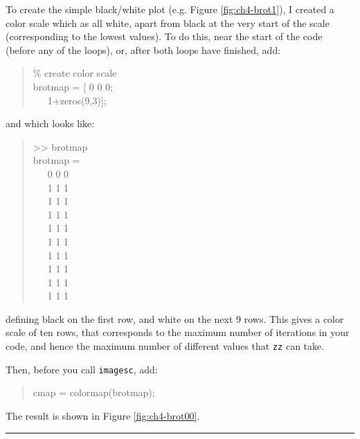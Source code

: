 \documentclass{tufte-book} %
\newenvironment{docspec}{\begin{quotation}\ttfamily\parskip0pt\parindent0pt\ignorespaces}{\end{quotation}}
\begin{document}
To create the simple black/white plot (e.g. Figure \ref{fig:ch4-brot1}), I created a color scale which as all white, apart from black at the very start of the scale (corresponding to the lowest values). To do this, near the start of the code (before any of the loops), or, after both loops have finished, add:
\begin{docspec}
\textcolor[rgb]{0,0.501961,0}{\% create color scale}\\
brotmap = [ 0 0 0;\\
\ \ \ 1+zeros(9,3)];
\end{docspec}
and which looks like:
\begin{docspec}
>> brotmap\\
brotmap =\\
\ \ \      0     0     0\\
\ \ \      1     1     1\\
\ \ \      1     1     1\\
\ \ \      1     1     1\\
\ \ \      1     1     1\\
\ \ \      1     1     1\\
\ \ \      1     1     1\\
\ \ \      1     1     1\\
\ \ \      1     1     1\\
\ \ \      1     1     1
\end{docspec}
defining black on the first row, and white on the next 9 rows. This gives a color scale of ten rows, that corresponds to the maximum number of iterations in your code, and hence the maximum number of different values that \texttt{zz} can take. 

Then, before you call \texttt{imagesc}, add:
\begin{docspec}
cmap = colormap(brotmap);
\end{docspec}

The result is shown in Figure \ref{fig:ch4-brot00}.

\vspace{1mm}
\noindent\rule{4cm}{0.5pt}
\vspace{2mm}
\end{document}
